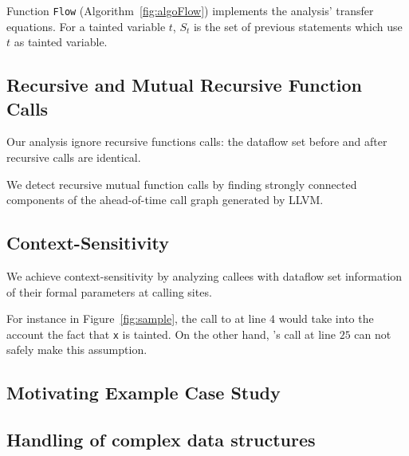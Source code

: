 Function \texttt{Flow} (Algorithm~\ref{fig:algoFlow})
implements the analysis' transfer equations.
For a tainted variable $t$, $S_t$ is the set of previous
statements which use $t$ as tainted variable.

\subsection{Recursive and Mutual Recursive Function Calls} 

Our analysis ignore recursive functions calls: the dataflow set
before and after recursive calls are identical. 

We detect recursive mutual function calls by finding strongly
connected components of the ahead-of-time call graph generated
by LLVM.

\subsection{Context-Sensitivity} 

We achieve context-sensitivity by analyzing callees
with dataflow set information of their formal parameters
at calling sites.

For instance in Figure~\ref{fig:sample}, the call to \even{} at
line $4$ would take into the account the fact that \texttt{x}
is tainted.
On the other hand, \even{}'s call at line $25$ can not safely
make this assumption.

\subsection{Motivating Example Case Study}\label{sec:sampleSummary}

\subsection{Handling of complex data structures}
